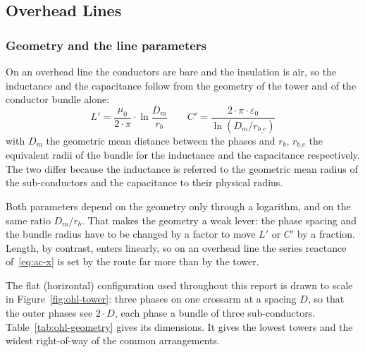 \subsection{Overhead Lines}
\label{sec:ohl}

\subsubsection{Geometry and the line parameters}
\label{sec:ohl-geometry}

On an overhead line the conductors are bare and the insulation is air, so
the inductance and the capacitance follow from the geometry of the tower and
of the conductor bundle alone:
\begin{equation}
  L' = \frac{\mu_0}{2 \cdot \pi} \cdot \ln\frac{D_m}{r_b}
  \qquad
  C' = \frac{2 \cdot \pi \cdot \varepsilon_0}{\ln\left(D_m / r_{b\_c}\right)}
  \label{eq:ohl-lc}
\end{equation}
with $D_m$ the geometric mean distance between the phases and $r_b$,
$r_{b\_c}$ the equivalent radii of the bundle for the inductance and the
capacitance respectively. The two differ because the inductance is referred
to the geometric mean radius of the sub-conductors and the capacitance to
their physical radius.

Both parameters depend on the geometry only through a logarithm, and on the
same ratio $D_m / r_b$. That makes the geometry a weak lever: the phase
spacing and the bundle radius have to be changed by a factor to move $L'$ or
$C'$ by a fraction. Length, by contrast, enters linearly, so on an overhead
line the series reactance of~\eqref{eq:ac-x} is set by the route far more
than by the tower.

The flat (horizontal) configuration used throughout this report is drawn to
scale in Figure~\ref{fig:ohl-tower}: three phases on one crossarm at a
spacing $D$, so that the outer phases see $2 \cdot D$, each phase a bundle
of three sub-conductors. Table~\ref{tab:ohl-geometry} gives its dimensions.
It gives the lowest towers and the widest right-of-way of the common
arrangements.

